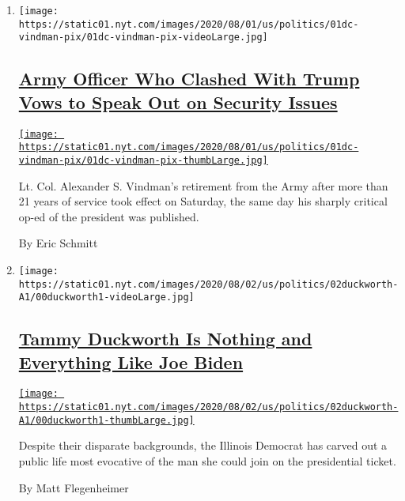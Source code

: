 \begin{enumerate}
\def\labelenumi{\arabic{enumi}.}
\item
  \texttt{[image: https://static01.nyt.com/images/2020/08/01/us/politics/01dc-vindman-pix/01dc-vindman-pix-videoLarge.jpg]}

  \hypertarget{army-officer-who-clashed-with-trump-vows-to-speak-out-on-security-issues}{%
  \subsection{\texorpdfstring{\href{/2020/08/01/us/politics/alexander-vindman-impeachment-trump.html}{Army
  Officer Who Clashed With Trump Vows to Speak Out on Security
  Issues}}{Army Officer Who Clashed With Trump Vows to Speak Out on Security Issues}}\label{army-officer-who-clashed-with-trump-vows-to-speak-out-on-security-issues}}

  \href{/2020/08/01/us/politics/alexander-vindman-impeachment-trump.html}{\texttt{[image: https://static01.nyt.com/images/2020/08/01/us/politics/01dc-vindman-pix/01dc-vindman-pix-thumbLarge.jpg]}}

  Lt. Col. Alexander S. Vindman's retirement from the Army after more
  than 21 years of service took effect on Saturday, the same day his
  sharply critical op-ed of the president was published.

  By Eric Schmitt
\item
  \texttt{[image: https://static01.nyt.com/images/2020/08/02/us/politics/02duckworth-A1/00duckworth1-videoLarge.jpg]}

  \hypertarget{tammy-duckworth-is-nothing-and-everything-like-joe-biden}{%
  \subsection{\texorpdfstring{\href{/2020/08/01/us/politics/tammy-duckworth-biden-vp.html}{Tammy
  Duckworth Is Nothing and Everything Like Joe
  Biden}}{Tammy Duckworth Is Nothing and Everything Like Joe Biden}}\label{tammy-duckworth-is-nothing-and-everything-like-joe-biden}}

  \href{/2020/08/01/us/politics/tammy-duckworth-biden-vp.html}{\texttt{[image: https://static01.nyt.com/images/2020/08/02/us/politics/02duckworth-A1/00duckworth1-thumbLarge.jpg]}}

  Despite their disparate backgrounds, the Illinois Democrat has carved
  out a public life most evocative of the man she could join on the
  presidential ticket.

  By Matt Flegenheimer
\end{enumerate}

